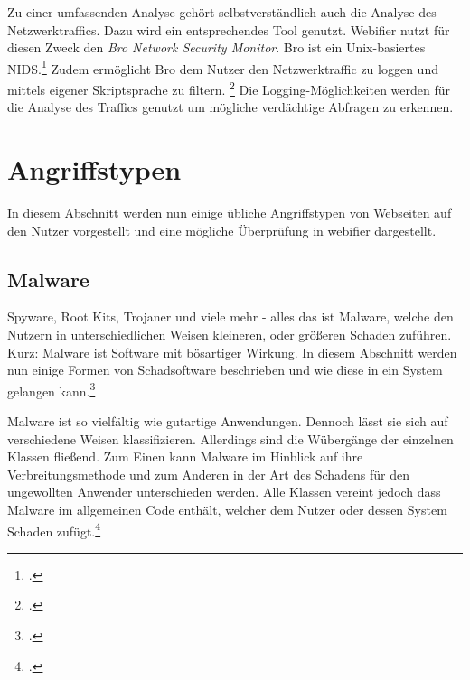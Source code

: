 Zu einer umfassenden Analyse gehört selbstverständlich auch die Analyse des Netzwerktraffics. Dazu wird ein entsprechendes Tool genutzt. Webifier nutzt für diesen Zweck den \textit{Bro Network Security Monitor}. Bro ist ein Unix-basiertes \ac{NIDS}.\footcite[Vgl.][199]{bro} Zudem ermöglicht Bro dem Nutzer den Netzwerktraffic zu loggen und mittels eigener Skriptsprache zu filtern. \footcite{bro2} Die Logging-Möglichkeiten werden für die Analyse des Traffics genutzt um mögliche verdächtige Abfragen zu erkennen.


\section{Angriffstypen}

In diesem Abschnitt werden nun einige übliche Angriffstypen von Webseiten auf den Nutzer vorgestellt und eine mögliche Überprüfung in webifier dargestellt.


\subsection{Malware}

Spyware, Root Kits, Trojaner und viele mehr - alles das ist Malware, welche den Nutzern in unterschiedlichen Weisen kleineren, oder größeren Schaden zuführen. Kurz: Malware ist Software mit bösartiger Wirkung. In diesem Abschnitt werden nun einige Formen von Schadsoftware beschrieben und wie diese in ein System gelangen kann.\footcite[Vgl.][95]{netzwerkDatensicherheit}

Malware ist so vielfältig wie gutartige Anwendungen. Dennoch lässt sie sich auf verschiedene Weisen klassifizieren. Allerdings sind die Wübergänge der einzelnen Klassen fließend. Zum Einen kann Malware im Hinblick auf ihre Verbreitungsmethode und zum Anderen in der Art des Schadens für den ungewollten Anwender unterschieden werden. Alle Klassen vereint jedoch dass Malware im allgemeinen Code enthält, welcher dem Nutzer oder dessen System Schaden zufügt.\footcite[Vgl.][95\psq]{netzwerkDatensicherheit}

